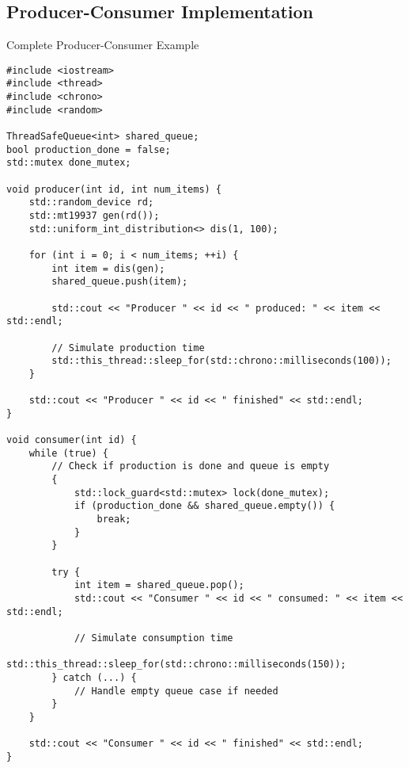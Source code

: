 \subsection{Producer-Consumer Implementation}
\begin{frame}[fragile]{ Complete Producer-Consumer Example}
\begin{verbatim}
#include <iostream>
#include <thread>
#include <chrono>
#include <random>

ThreadSafeQueue<int> shared_queue;
bool production_done = false;
std::mutex done_mutex;

void producer(int id, int num_items) {
    std::random_device rd;
    std::mt19937 gen(rd());
    std::uniform_int_distribution<> dis(1, 100);

    for (int i = 0; i < num_items; ++i) {
        int item = dis(gen);
        shared_queue.push(item);

        std::cout << "Producer " << id << " produced: " << item << std::endl;

        // Simulate production time
        std::this_thread::sleep_for(std::chrono::milliseconds(100));
    }

    std::cout << "Producer " << id << " finished" << std::endl;
}

void consumer(int id) {
    while (true) {
        // Check if production is done and queue is empty
        {
            std::lock_guard<std::mutex> lock(done_mutex);
            if (production_done && shared_queue.empty()) {
                break;
            }
        }

        try {
            int item = shared_queue.pop();
            std::cout << "Consumer " << id << " consumed: " << item << std::endl;

            // Simulate consumption time
            std::this_thread::sleep_for(std::chrono::milliseconds(150));
        } catch (...) {
            // Handle empty queue case if needed
        }
    }

    std::cout << "Consumer " << id << " finished" << std::endl;
}
	\end{verbatim}
\end{frame}

